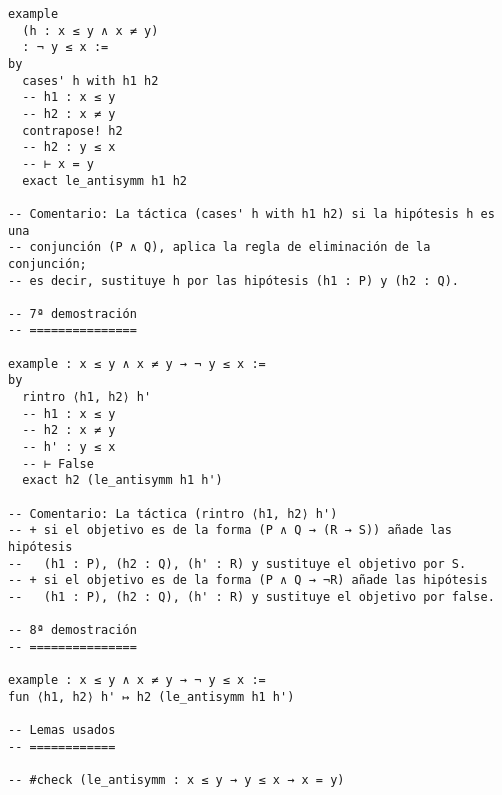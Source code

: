 \begin{verbatim}
example
  (h : x ≤ y ∧ x ≠ y)
  : ¬ y ≤ x :=
by
  cases' h with h1 h2
  -- h1 : x ≤ y
  -- h2 : x ≠ y
  contrapose! h2
  -- h2 : y ≤ x
  -- ⊢ x = y
  exact le_antisymm h1 h2

-- Comentario: La táctica (cases' h with h1 h2) si la hipótesis h es una
-- conjunción (P ∧ Q), aplica la regla de eliminación de la conjunción;
-- es decir, sustituye h por las hipótesis (h1 : P) y (h2 : Q).

-- 7ª demostración
-- ===============

example : x ≤ y ∧ x ≠ y → ¬ y ≤ x :=
by
  rintro ⟨h1, h2⟩ h'
  -- h1 : x ≤ y
  -- h2 : x ≠ y
  -- h' : y ≤ x
  -- ⊢ False
  exact h2 (le_antisymm h1 h')

-- Comentario: La táctica (rintro ⟨h1, h2⟩ h')
-- + si el objetivo es de la forma (P ∧ Q → (R → S)) añade las hipótesis
--   (h1 : P), (h2 : Q), (h' : R) y sustituye el objetivo por S.
-- + si el objetivo es de la forma (P ∧ Q → ¬R) añade las hipótesis
--   (h1 : P), (h2 : Q), (h' : R) y sustituye el objetivo por false.

-- 8ª demostración
-- ===============

example : x ≤ y ∧ x ≠ y → ¬ y ≤ x :=
fun ⟨h1, h2⟩ h' ↦ h2 (le_antisymm h1 h')

-- Lemas usados
-- ============

-- #check (le_antisymm : x ≤ y → y ≤ x → x = y)
\end{verbatim}

